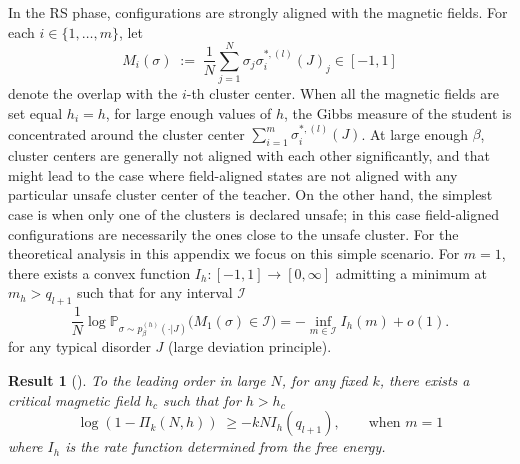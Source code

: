 \documentclass{article}
\newtheorem{theorem}{Result}
\theoremstyle{remark} %
\begin{document}
In the RS phase, configurations are strongly aligned with the magnetic fields. For each $i \in \{1, \ldots, m\}$, let
\begin{equation}
M_i(\sigma)\;:=\;\frac{1}{N}\sum_{j=1}^N \sigma_j\sigma^{\ast,(l)}_i(J)_j \in[-1,1]
\end{equation}
denote the overlap with the $i$-th cluster center. When all the magnetic fields are set equal $h_i=h$, for large enough values of $h$, the Gibbs measure of the student is concentrated around the cluster center $\sum_{i=1}^m \sigma^{\ast,(l)}_i(J)$. At large enough $\beta$, cluster centers are generally not aligned with each other significantly, and that might lead to the case where field-aligned states are not aligned with any particular unsafe cluster center of the teacher. On the other hand, the simplest case is when only one of the clusters is declared unsafe; in this case field-aligned configurations are necessarily the ones close to the unsafe cluster. For the theoretical analysis in this appendix we focus on this simple scenario. For $m=1$, there exists a 
convex function $I_{h}:[-1,1]\to[0,\infty]$ admitting a minimum at $m_{h}>q_{l+1}$ such that for any interval $\mathcal{I}$
\begin{equation}
\frac{1}{N}\log  \mathbb P_{\sigma\sim p^{(h)}_\beta(\cdot \vert J)}\big(M_1(\sigma)\in \mathcal{I}\big)
= -\inf_{m \in \mathcal{I}} I_{h}(m)+o(1).
\label{eq:ldp_statement}
\end{equation}
for any typical disorder $J$ (large deviation principle).





\begin{theorem}[]
\label{thm:rs_field_ordered}
To the leading order in large $N$, for any fixed $k$, there exists a critical magnetic field $h_c$ such that for $h>h_c$
\begin{equation}
\log (1-\Pi_k(N,h))
\;\geq-k N I_h(q_{l+1}) , \qquad \text{when $m=1$}
\label{eq:inftime_gap_rs}
\end{equation}
where $I_h$ is the rate function determined from the free energy.
\end{theorem}
\end{document}
